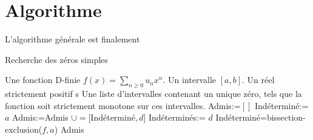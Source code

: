 \documentclass[a4paper,10.5pt]{article}
\begin{document}
	

		
	\section{Algorithme}
	
	L'algorithme générale est finalement
	
	\begin{algorithm}
		\caption{Recherche des zéros simples}
		\begin{algorithmic}[1]
			\REQUIRE Une fonction D-finie $f(x)=\sum_{n \geq 0} u_nx^{n}$. Un intervalle $[a,b]$. Un réel strictement positif s
			\ENSURE  Une liste d'intervalles contenant un unique zéro, tels que la fonction soit strictement monotone sur ces intervalles.
			\STATE Admis:=$[]$
			\STATE Indéterminé:=$a$
				\STATE Admis:=Admis $\cup=[$Indéterminé$,d]$
				\STATE Indéterminés:= $d$  
			\ELSE 
			\STATE Indéterminé=bissection-exclusion($f,a$)
			\ENDIF
			\ENDWHILE
			\RETURN Admis
		\end{algorithmic}
	\end{algorithm}	

	
	
	
	
\end{document}
